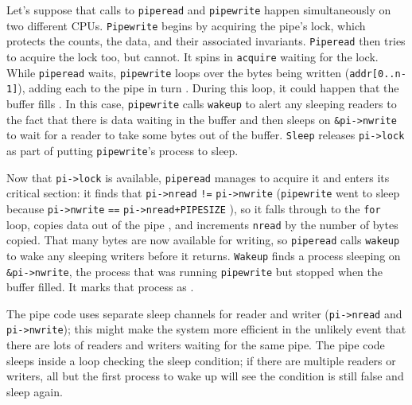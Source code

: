 Let's suppose that calls to
\lstinline{piperead}
and
\lstinline{pipewrite}
happen simultaneously on two different CPUs.
\lstinline{Pipewrite}
begins by acquiring the pipe's lock, which
protects the counts, the data, and their
associated invariants.
\lstinline{Piperead}
then tries to acquire the lock too, but cannot.
It spins in
\lstinline{acquire}
waiting for the lock.
While
\lstinline{piperead}
waits,
\lstinline{pipewrite}
loops over the bytes being written
(\lstinline{addr[0..n-1]}),
adding each to the pipe in turn
.
During this loop, it could happen that
the buffer fills
.
In this case, 
\lstinline{pipewrite}
calls
\lstinline{wakeup}
to alert any sleeping readers to the fact
that there is data waiting in the buffer
and then sleeps on
\lstinline{&pi->nwrite}
to wait for a reader to take some bytes
out of the buffer.
\lstinline{Sleep}
releases 
\lstinline{pi->lock}
as part of putting
\lstinline{pipewrite}'s
process to sleep.

Now that
\lstinline{pi->lock}
is available,
\lstinline{piperead}
manages to acquire it and enters its critical section:
it finds that
\lstinline{pi->nread}
\lstinline{!=}
\lstinline{pi->nwrite}
(\lstinline{pipewrite}
went to sleep because
\lstinline{pi->nwrite}
\lstinline{==}
\lstinline{pi->nread+PIPESIZE}
),
so it falls through to the 
\lstinline{for}
loop, copies data out of the pipe
,
and increments 
\lstinline{nread}
by the number of bytes copied.
That many bytes are now available for writing, so
\lstinline{piperead}
calls
\lstinline{wakeup}
to wake any sleeping writers
before it returns.
\lstinline{Wakeup}
finds a process sleeping on
\lstinline{&pi->nwrite},
the process that was running
\lstinline{pipewrite}
but stopped when the buffer filled.
It marks that process as
.

The pipe code uses separate sleep channels for reader and writer
(\lstinline{pi->nread}
and
\lstinline{pi->nwrite});
this might make the system more efficient in the unlikely
event that there are lots of
readers and writers waiting for the same pipe.
The pipe code sleeps inside a loop checking the
sleep condition; if there are multiple readers
or writers, all but the first process to wake up
will see the condition is still false and sleep again.
